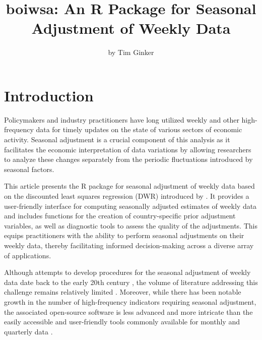 \title{boiwsa: An R Package for Seasonal Adjustment of Weekly Data}


\author{by Tim Ginker}

\maketitle


\hypertarget{introduction}{%
\section{Introduction}\label{introduction}}

Policymakers and industry practitioners have long utilized weekly and other high-frequency data for timely updates on the state of various sectors of economic activity. Seasonal adjustment is a crucial component of this analysis as it facilitates the economic interpretation of data variations by allowing researchers to analyze these changes separately from the periodic fluctuations introduced by seasonal factors.

This article presents the R package  for seasonal adjustment of weekly data based on the discounted least squares regression (DWR) introduced by \citet{DWR}. It provides a user-friendly interface for computing seasonally adjusted estimates of weekly data and includes functions for the creation of country-specific prior adjustment variables, as well as diagnostic tools to assess the quality of the adjustments. This equips practitioners with the ability to perform seasonal adjustments on their weekly data, thereby facilitating informed decision-making across a diverse array of applications.

Although attempts to develop procedures for the seasonal adjustment of weekly data date back to the early 20th century \citep{crum1927}, the volume of literature addressing this challenge remains relatively limited \citep[for the latest review of the available methodology, see][]{proietti2023seasonality}. Moreover, while there has been notable growth in the number of high-frequency indicators requiring seasonal adjustment, the associated open-source software is less advanced and more intricate than the easily accessible and user-friendly tools commonly available for monthly and quarterly data \citep[see][]{evansreview, ts_task_view}.

